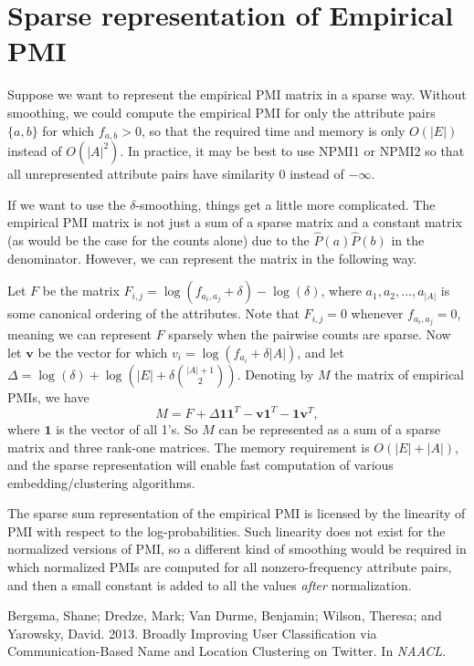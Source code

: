 \documentclass[11pt, oneside, fleqn]{article}   	%
\theoremstyle{plain}
\begin{document}
\section{Sparse representation of Empirical PMI}
Suppose we want to represent the empirical PMI matrix in a sparse way.  Without smoothing, we could compute the empirical PMI for only the attribute pairs $\{a, b\}$ for which $f_{a,b} > 0$, so that the required time and memory is only $O(|E|)$ instead of $O(|A|^2)$.  In practice, it may be best to use NPMI1 or NPMI2 so that all unrepresented attribute pairs have similarity 0 instead of $-\infty$.

If we want to use the $\delta$-smoothing, things get a little more complicated.  The empirical PMI matrix is not just a sum of a sparse matrix and a constant matrix (as would be the case for the counts alone) due to the $\hat{P}(a) \hat{P}(b)$ in the denominator.  However, we can represent the matrix in the following way.

Let $F$ be the matrix $F_{i,j} = \log(f_{a_i,a_j} + \delta) - \log(\delta)$, where $a_1, a_2, \ldots, a_{|A|}$ is some canonical ordering of the attributes.  Note that $F_{i,j} = 0$ whenever $f_{a_i,a_j} = 0$, meaning we can represent $F$ sparsely when the pairwise counts are sparse.  Now let $\textbf{v}$ be the vector for which $v_i = \log(f_{a_i} + \delta |A|)$, and let $\Delta = \log(\delta) + \log(|E| + \delta \binom{|A| + 1}{2})$.  Denoting by $M$ the matrix of empirical PMIs, we have
$$ M = F + \Delta \mathbf{1} \mathbf{1}^T - \mathbf{v} \mathbf{1}^T - \mathbf{1} \mathbf{v}^T, $$
where $\mathbf{1}$ is the vector of all 1's.  So $M$ can be represented as a sum of a sparse matrix and three rank-one matrices.  The memory requirement is $O(|E| + |A|)$, and the sparse representation will enable fast computation of various embedding/clustering algorithms.

The sparse sum representation of the empirical PMI is licensed by the linearity of PMI with respect to the log-probabilities.  Such linearity does not exist for the normalized versions of PMI, so a different kind of smoothing would be required in which normalized PMIs are computed for all nonzero-frequency attribute pairs, and then a small constant is added to all the values \textit{after} normalization.


\begin{thebibliography}{1}
Bergsma, Shane; Dredze, Mark; Van Durme, Benjamin; Wilson, Theresa; and Yarowsky, David.  2013.  Broadly Improving User Classification via Communication-Based Name and Location Clustering on Twitter.  In \textit{NAACL}.
\end{thebibliography}
\end{document}
